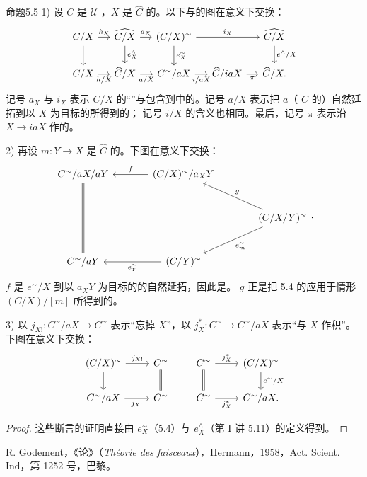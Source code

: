 \begin{SGAresult}{命题}{5.5}
1) 设 $C$ 是 $\mathcal U$-，$X$ 是 $\widehat C$ 的。以下与的图在意义下交换：
\[
\begin{tikzcd}[column sep=small]
 C/X\arrow[r,"h_X"]\arrow[d]&\widehat{C/X}\arrow[r,"a_X"]\arrow[d,"e_X^{\wedge}"]&(C/X)^{\sim}\arrow[rr,"i_X"]\arrow[d,"e_X^{\sim}"]&&\widehat{C/X}\arrow[d,"e^{\wedge}/X"]\\
 C/X\arrow[r,"h/X"']&\widehat C/X\arrow[r,"a/X"']&C^{\sim}/aX\arrow[r,"i/aX"']&\widehat C/iaX\arrow[r,"\pi"']&\widehat C/X.
\end{tikzcd}
\]
记号 $a_X$ 与 $i_X$ 表示 $C/X$ 的“”与包含到中的。记号 $a/X$ 表示把 $a$（ $C$ 的）自然延拓到以 $X$ 为目标的所得到的；
记号 $i/X$ 的含义也相同。最后，记号 $\pi$ 表示沿 $X\to iaX$ 作的。

2) 再设 $m:Y\to X$ 是 $\widehat C$ 的。下图在意义下交换：
\[
\begin{tikzcd}[column sep=large,row sep=large]
 C^{\sim}/aX/aY\arrow[dd,equal]&(C/X)^{\sim}/a_XY\arrow[l,"f"']&\\
 &&(C/X/Y)^{\sim}\arrow[ul,"g"']\arrow[dl,"e_m^{\sim}"]\\
 C^{\sim}/aY&(C/Y)^{\sim}\arrow[l,"e_Y^{\sim}"]&
\end{tikzcd}.
\]
 $f$ 是 $e^{\sim}/X$ 到以 $a_XY$ 为目标的的自然延拓，因此是。 $g$ 正是把 5.4 的应用于情形 $(C/X)/[m]$ 所得到的。

3) 以 $j_{X!}:C^{\sim}/aX\to C^{\sim}$ 表示“忘掉 $X$”，以 $j_X^*:C^{\sim}\to C^{\sim}/aX$ 表示“与 $X$ 作积”。下图在意义下交换：
\[
\begin{tikzcd}
 (C/X)^{\sim}\arrow[r,"j_{X!}"]\arrow[d]&C^{\sim}\arrow[d,equal]\\
 C^{\sim}/aX\arrow[r,"j_{X!}"']&C^{\sim}
\end{tikzcd}
\qquad
\begin{tikzcd}
 C^{\sim}\arrow[r,"j_X^*"]\arrow[d,equal]&(C/X)^{\sim}\arrow[d,"e^{\sim}/X"]\\
 C^{\sim}\arrow[r,"j_X^*"']&C^{\sim}/aX.
\end{tikzcd}
\]
\end{SGAresult}
\begin{proof}
这些断言的证明直接由 $e_X^{\sim}$（5.4）与 $e_X^{\wedge}$（第 I 讲 5.11）的定义得到。
\end{proof}

\noindent [1] [TF] R. Godement，《论》（\textit{Théorie des faisceaux}），Hermann，1958，Act. Scient. Ind，第 1252 号，巴黎。
